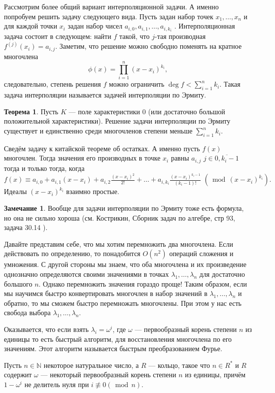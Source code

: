 \documentclass[10pt,a4paper,oneside]{book}
\theoremstyle{definition}
\newtheorem*{rem}{Замечание}
\newtheorem{thm}{Теорема}
\renewcommand{\mod}{\,\operatorname{mod}\,}
\newcommand{\mb}[1]{\mathbb{#1}}
\newcommand{\ovl}{\overline}
\newcommand{\nequiv}{\not \equiv}
\def\thrm{\begin{thm}}
\def\ethrm{\end{thm}}
\def\rm{\begin{rem}}
\def\erm{\end{rem}}
\begin{document}
Рассмотрим более общий вариант интерполяционной задачи. А именно попробуем решить задачу следующего вида.
Пусть задан набор точек $x_1,\dots, x_n$ и для каждой точки $x_i$ задан набор чисел $a_{i,0}, a_{i,1},\dots , a_{i,k_i}$ . Интерполяционная задача состоит в следующем: найти $f$ такой, что $j$-тая производная $f^{(j)}(x_i)=a_{i,j}$. Заметим, что решение можно свободно поменять на кратное многочлена
$$\phi(x)=\prod_{i=1}^n (x-x_i)^{k_i} ,$$
следовательно, степень решения $f$ можно ограничить $\deg f < \sum_{i=1}^n k_i$. Такая задача интерполяции называется задачей интерполяции по Эрмиту.



\thrm Пусть $K$ --- поле характеристики 0 (или достаточно большой положительной характеристики). Решение задачи интерполяции по Эрмиту существует и единственно среди многочленов степени меньше $\sum_{i=1}^n k_i$.
\ethrm
\proof Сведём задачу к китайской теореме об остатках. А именно пусть $f(x)$ многочлен. Тогда значения его производных в точке $x_i$ равны $a_{i,j}$ $j\in \ovl{0,k_i-1}$ тогда и только тогда, когда 
$$f(x)\equiv a_{i,0}+a_{i,1}(x-x_i)+a_{i,2}\tfrac{(x-x_i)^2}{2!}+\dots+ a_{i,k_i}\tfrac{(x-x_i)^{k_i-1}}{(k_i-1)!}\,\, (\mod (x-x_i)^{k_i}).$$
Идеалы $(x-x_i)^{k_i}$ взаимно простые.
\endproof

\rm Вообще для  задачи интерполяции по Эрмиту тоже есть формула, но она не сильно хороша (см. Кострикин, Сборник задач по алгебре, стр 93, задача 30.14 ).\erm


Давайте представим себе, что мы хотим перемножить два многочлена. Если действовать по определению, то понадобится $O(n^2)$ операций сложения и умножения. С другой стороны мы знаем, что оба многочлена и их произведение однозначно определяются своими значениями в точках $\lambda_1,\dots, \lambda_n$ для достаточно большого $n$. Однако перемножить значения гораздо проще! Таким образом, если мы научимся быстро конвертировать многочлен в набор значений в $\lambda_1,\dots, \lambda_n$ и обратно, то мы сможем быстро перемножать многочлены. При этом у нас есть свобода выбора $\lambda_1,\dots, \lambda_n$. 

Оказывается, что если взять $\lambda_i=\omega^i$, где $\omega$ --- первообразный корень степени $n$ из единицы  то есть быстрый алгоритм, для восстановления многочлена по его значениям. Этот алгоритм называется быстрым преобразованием Фурье. 

Пусть $n\in \mb N$ некоторое натуральное число, а $R$ --- кольцо, такое что $n\in R^*$ и $R$ содержит $\omega$ --- некоторый первообразный корень  степени $n$ из единицы, причём $1-\omega^i$ не делитель нуля при $i\nequiv 0(\mod n)$.
\end{document}
